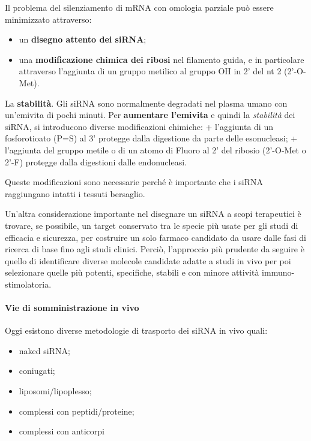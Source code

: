 \documentclass[]{article}
\begin{document}
Il problema del silenziamento di mRNA con omologia parziale può essere
minimizzato attraverso:

\begin{itemize}
\itemsep1pt\parskip0pt
\item
  un \textbf{disegno attento dei siRNA};
\item
  una \textbf{modificazione chimica dei ribosi} nel filamento guida, e
  in particolare attraverso l'aggiunta di un gruppo metilico al gruppo
  OH in 2' del nt 2 (2'-O-Met).
\end{itemize}

La \textbf{stabilità}. Gli siRNA sono normalmente degradati nel plasma
umano con un'emivita di pochi minuti. Per \textbf{aumentare l'emivita} e
quindi la \emph{stabilità} dei siRNA, si introducono diverse
modificazioni chimiche: + l'aggiunta di un fosforotioato (P=S) al 3'
protegge dalla digestione da parte delle esonucleasi; + l'aggiunta del
gruppo metile o di un atomo di Fluoro al 2' del ribosio (2'-O-Met o
2'-F) protegge dalla digestioni dalle endonucleasi.

Queste modificazioni sono necessarie perché è importante che i siRNA
raggiungano intatti i tessuti bersaglio.

Un'altra considerazione importante nel disegnare un siRNA a scopi
terapeutici è trovare, se possibile, un target conservato tra le specie
più usate per gli studi di efficacia e sicurezza, per costruire un solo
farmaco candidato da usare dalle fasi di ricerca di base fino agli studi
clinici. Perciò, l'approccio più prudente da seguire è quello di
identificare diverse molecole candidate adatte a studi in vivo per poi
selezionare quelle più potenti, specifiche, stabili e con minore
attività immuno-stimolatoria.

\paragraph{Vie di somministrazione in
vivo}\label{vie-di-somministrazione-in-vivo}

Oggi esistono diverse metodologie di trasporto dei siRNA in vivo quali:

\begin{itemize}
\itemsep1pt\parskip0pt
\item
  naked siRNA;
\item
  coniugati;
\item
  liposomi/lipoplesso;
\item
  complessi con peptidi/proteine;
\item
  complessi con anticorpi
\end{itemize}
\end{document}
